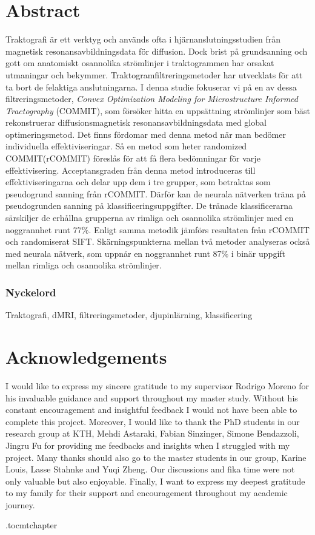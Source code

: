 \chapter*{Abstract}
Traktografi är ett verktyg och används ofta i hjärnanslutningsstudien från
magnetisk resonansavbildningsdata för diffusion. Dock brist på grundsanning och gott om
anatomiskt osannolika strömlinjer i traktogrammen har orsakat utmaningar och bekymmer.
Traktogramfiltreringsmetoder har utvecklats för att ta bort de felaktiga anslutningarna.
I denna studie fokuserar vi på en av dessa filtreringsmetoder, \textit{Convex Optimization Modeling for Microstructure Informed Tractography} (COMMIT),
som försöker hitta en uppsättning strömlinjer som bäst rekonstruerar diffusionsmagnetisk resonansavbildningsdata med global optimeringsmetod.
Det finns fördomar med denna metod när man bedömer individuella effektiviseringar.
Så en metod som heter randomized COMMIT(rCOMMIT) föreslås för att få flera bedömningar för varje effektivisering.
Acceptansgraden från denna metod introduceras till effektiviseringarna och delar upp dem i tre grupper, som
betraktas som pseudogrund sanning från rCOMMIT. Därför kan de neurala nätverken träna på pseudogrunden sanning på
klassificeringsuppgifter. De tränade klassificerarna särskiljer de erhållna grupperna av rimliga och osannolika strömlinjer med en noggrannhet runt 77\%.
Enligt samma metodik jämförs resultaten från rCOMMIT och randomiserat SIFT.
Skärningspunkterna mellan två metoder analyseras också med neurala nätverk, som uppnår en noggrannhet runt 87\% i binär uppgift mellan rimliga och osannolika strömlinjer.
\subsection*{Nyckelord}
Traktografi, dMRI, filtreringsmetoder, djupinlärning, klassificering

\newpage
\thispagestyle{plain}
\chapter*{Acknowledgements}
I would like to express my sincere gratitude to my supervisor Rodrigo Moreno for his invaluable guidance and support 
throughout my master study. Without his constant encouragement and insightful feedback I would not have been able to complete this project.
Moreover, I would like to thank the PhD students in our research group at KTH, 
Mehdi Astaraki, Fabian Sinzinger, Simone Bendazzoli, Jingru Fu for providing me feedbacks and insights when I struggled with my project.
Many thanks should also go to the master students in our group, Karine Louis, Lasse Stahnke and Yuqi Zheng. 
Our discussions and fika time were not only valuable but also enjoyable.
Finally, I want to express my deepest gratitude to my family for their support and encouragement throughout my academic journey.

\newpage

% 

\newpage

\etocdepthtag.toc{mtchapter}
\thispagestyle{plain}
\tableofcontents

\newpage


